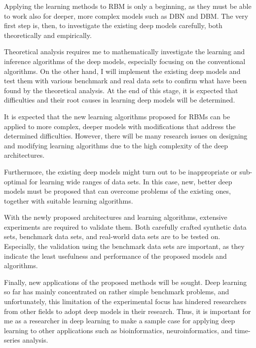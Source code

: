 \documentclass[11pt, oneside]{essay}
\begin{document}
Applying the learning methods to RBM is only a beginning, as
they must be able to work also for deeper, more complex
models such as DBN and DBM.  The very first step is, then, to
investigate the existing deep models carefully, both 
theoretically and empirically. 

Theoretical analysis requires me to mathematically
investigate the learning and inference algorithms of the
deep models, especially focusing on the conventional
algorithms. On the other hand, I will implement the existing
deep models and test them with various benchmark and real
data sets to confirm what have been found by the theoretical
analysis.  At the end of this stage, it is expected that
 difficulties and their root causes in learning deep models will
be determined.

It is 
expected that the new learning algorithms proposed for RBMs
can be applied to more complex, deeper models with
modifications that address the determined difficulties.
However, there will be many research issues on designing and
modifying learning algorithms due to the high complexity of
the deep architectures.

Furthermore, the existing deep models might turn out to be
inappropriate or sub-optimal for learning wide ranges of
data sets. In this case, new, better deep models must be
proposed that can overcome problems of the existing ones,
together with suitable learning algorithms.

With the newly proposed architectures and learning
algorithms, extensive experiments are required to validate
them. Both carefully crafted synthetic data sets,
benchmark data sets, and real-world data sets are to be
tested on. Especially, the validation using the benchmark
data sets are important, as they indicate the least
usefulness and performance of the proposed models and
algorithms.

Finally, new applications of the proposed methods will be
sought. Deep learning so far has mainly concentrated on
rather simple benchmark problems, and
unfortunately, this limitation of the experimental focus has
hindered researchers from other fields to adopt deep models
in their research. Thus, it is important for me as a
researcher in deep learning to make a sample case for applying
deep learning to other applications such as bioinformatics,
neuroinformatics, and time-series analysis.
\end{document}
